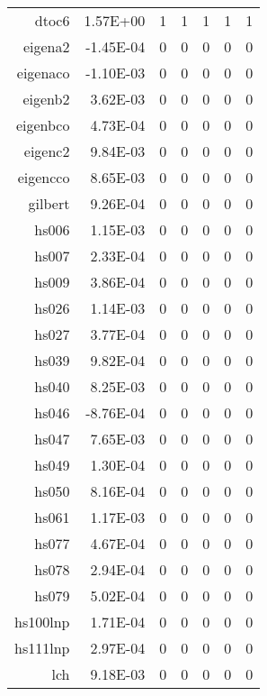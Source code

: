 \begin{table}[htbp]
\begin{tabular}{rrrrrrr}
    dtoc6 & 1.57E+00 & 1     & 1     & 1     & 1     & 1 \\
    eigena2 & -1.45E-04 & 0     & 0     & 0     & 0     & 0 \\
    eigenaco & -1.10E-03 & 0     & 0     & 0     & 0     & 0 \\
    eigenb2 & 3.62E-03 & 0     & 0     & 0     & 0     & 0 \\
    eigenbco & 4.73E-04 & 0     & 0     & 0     & 0     & 0 \\
    eigenc2 & 9.84E-03 & 0     & 0     & 0     & 0     & 0 \\
    eigencco & 8.65E-03 & 0     & 0     & 0     & 0     & 0 \\
    gilbert & 9.26E-04 & 0     & 0     & 0     & 0     & 0 \\
    hs006 & 1.15E-03 & 0     & 0     & 0     & 0     & 0 \\
    hs007 & 2.33E-04 & 0     & 0     & 0     & 0     & 0 \\
    hs009 & 3.86E-04 & 0     & 0     & 0     & 0     & 0 \\
    hs026 & 1.14E-03 & 0     & 0     & 0     & 0     & 0 \\
    hs027 & 3.77E-04 & 0     & 0     & 0     & 0     & 0 \\
    hs039 & 9.82E-04 & 0     & 0     & 0     & 0     & 0 \\
    hs040 & 8.25E-03 & 0     & 0     & 0     & 0     & 0 \\
    hs046 & -8.76E-04 & 0     & 0     & 0     & 0     & 0 \\
    hs047 & 7.65E-03 & 0     & 0     & 0     & 0     & 0 \\
    hs049 & 1.30E-04 & 0     & 0     & 0     & 0     & 0 \\
    hs050 & 8.16E-04 & 0     & 0     & 0     & 0     & 0 \\
    hs061 & 1.17E-03 & 0     & 0     & 0     & 0     & 0 \\
    hs077 & 4.67E-04 & 0     & 0     & 0     & 0     & 0 \\
    hs078 & 2.94E-04 & 0     & 0     & 0     & 0     & 0 \\
    hs079 & 5.02E-04 & 0     & 0     & 0     & 0     & 0 \\
    hs100lnp & 1.71E-04 & 0     & 0     & 0     & 0     & 0 \\
    hs111lnp & 2.97E-04 & 0     & 0     & 0     & 0     & 0 \\
    lch   & 9.18E-03 & 0     & 0     & 0     & 0     & 0 \\

\end{tabular}
\end{table}
